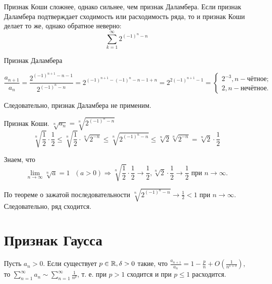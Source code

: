 	\begin{example}
		Признак Коши сложнее, однако сильнее, чем признак Даламбера. Если признак Даламбера подтверждает сходимость или расходимость ряда, то и признак Коши делает то же, однако обратное неверно:
		\[ \sum_{k = 1}^{\infty} 2^{(-1)^n - n} \]
	\end{example}
	
	Признак Даламбера
	
	\[ \frac{a_{n + 1}}{a_n} = \frac{2^{(-1)^{n + 1} - n - 1}}{2^{(-1)^n - n}} = 2^{(-1)^{n + 1} - (-1)^{n} - n - 1 + n} = 2^{2(-1)^{n + 1} -1} = \left\{{
		\begin{matrix}
			2^{-3}, n - \text{чётное}; \\
			2, n - \text{нечётное}.
		\end{matrix}
	}\right. \]
	
	Следовательно, признак Даламбера не применим.
	
	Признак Коши. $\sqrt[n]{a_n} = \sqrt[n]{2^{(-1)^n - n}}$
	\[ \sqrt[n]{\frac{1}{2}} \cdot \frac{1}{2} \leqslant \sqrt[n]{\frac{1}{2}} \cdot \sqrt[n]{2^{-n}} \leqslant \sqrt[n]{2^{(-1)^n - n}} \leqslant \sqrt[n]{2} \sqrt[n]{2^{-n}} = \sqrt[n]{2} \cdot \frac{1}{2} \]

	Знаем, что
	\[ \lim_{n \to \infty} \sqrt[n]{a} = 1 \text{ } (a > 0) \Rightarrow \sqrt[n]{\frac{1}{2}} \cdot \frac{1}{2} \to \frac{1}{2}, \sqrt[n]{2} \cdot \frac{1}{2} \to \frac{1}{2} \text{ при } n \to \infty. \]
	
	По теореме о зажатой последовательности $\sqrt[n]{2^{(-1)^n - n}} \to \frac{1}{2} < 1$ при $n \to \infty$. Следовательно, ряд сходится.
	
	\section{Признак Гаусса}
	
	\begin{theorem}
		Пусть $a_n > 0$. Если существует $p \in \mathbb R, \delta > 0$ такие, что $\frac{a_{n + 1}}{a_n} = 1 - \frac{p}{n} + O(\frac{1}{n^{1 + \delta}})$, то $\displaystyle \sum_{n = 1}^{\infty} a_n \sim \sum_{n = 1}^{\infty} {\frac{1}{n^p}}$, т. е. при $p > 1$ сходится и при $p \leqslant 1$ расходится.
	\end{theorem}
	
